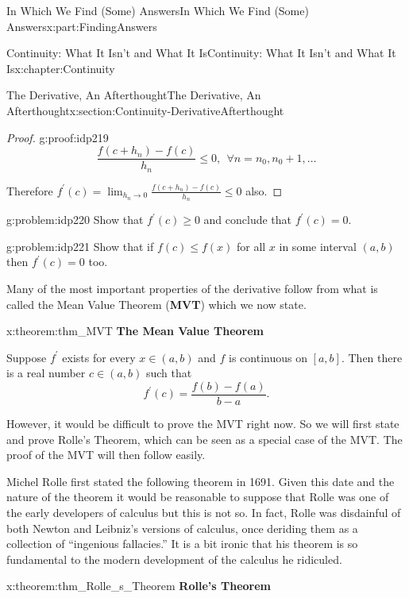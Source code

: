 \documentclass[oneside,10pt,]{book}
\newcommand{\terminology}[1]{\textbf{#1}}
\numberwithin{equation}{section}
\def\limit#1#2#3{{\displaystyle\lim_{#1\rightarrow #2}#3}}
\begin{document}
\begin{partptx}{In Which We Find (Some) Answers}{}{In Which We Find (Some) Answers}{}{}{x:part:FindingAnswers}
\begin{chapterptx}{Continuity: What It Isn't and What It Is}{}{Continuity: What It Isn't and What It Is}{}{}{x:chapter:Continuity}
\begin{sectionptx}{The Derivative, An Afterthought}{}{The Derivative, An Afterthought}{}{}{x:section:Continuity-DerivativeAfterthought}
\begin{proof}{}{g:proof:idp219}
\begin{equation*}
\frac{f\left(c+h_n\right)-f(c)}{h_n}\leq 0, \ \ \forall
n=n_0, n_0+1, \ldots 
\end{equation*}
%
\par
Therefore \(f^\prime(c) =
\limit{h_n}{0}{\frac{f\left(c+h_n\right)-f(c)}{h_n}} \leq 0\) also.%
\end{proof}
\begin{problem}{}{g:problem:idp220}%
 Show that \(f^\prime(c) \geq 0\) and conclude that \(f^\prime(c) =0\).%
\end{problem}
\begin{problem}{}{g:problem:idp221}%
 Show that if \(f(c) \leq f(x)\) for all \(x\) in some interval \((a,b)\) then \(f^\prime(c) =0\) too.%
\end{problem}
Many of the most important properties of the derivative follow from what is called the Mean Value Theorem (\terminology{MVT}) which we now state.%
\begin{theorem}{}{}{x:theorem:thm_MVT}%
\terminology{The Mean Value Theorem}%
\par
{} Suppose \(f^\prime\) exists for every \(x\in(a,b)\) and \(f\) is continuous on \([a,b]\).  Then there is a real number \(c\in(a,b)\) such that%
\begin{equation*}
f^\prime(c)=\frac{f(b)-f(a)}{b-a}.{}
\end{equation*}
%
\end{theorem}
However, it would be difficult to prove the MVT right now.  So we will first state and prove Rolle's Theorem, which can be seen as a special case of the MVT. The proof of the MVT will then follow easily.%
\par
Michel Rolle first stated the following theorem in 1691. Given this date and the nature of the theorem it would be reasonable to suppose that Rolle was one of the early developers of calculus but this is not so.  In fact, Rolle was disdainful of both Newton  and Leibniz's versions of calculus, once deriding them as a collection of ``ingenious fallacies.'' It is a bit ironic that his theorem is so fundamental to the modern development of the calculus he ridiculed.%
\begin{theorem}{}{}{x:theorem:thm_Rolle_s_Theorem}%
%
\terminology{Rolle's Theorem}%
\par

\end{theorem}
\end{sectionptx}
\end{chapterptx}
\end{partptx}
\end{document}
